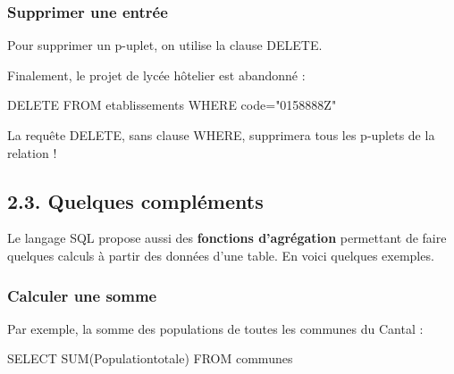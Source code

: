 \documentclass[
  a4paper,
  DIV=11,
  numbers=noendperiod]{scrartcl}
\newenvironment{Shaded}{\begin{snugshade}}{\end{snugshade}}
\newcommand{\FunctionTok}[1]{\textcolor[rgb]{0.28,0.35,0.67}{#1}}
\newcommand{\KeywordTok}[1]{\textcolor[rgb]{0.00,0.23,0.31}{#1}}
\newcommand{\NormalTok}[1]{\textcolor[rgb]{0.00,0.23,0.31}{#1}}
\newcommand{\OperatorTok}[1]{\textcolor[rgb]{0.37,0.37,0.37}{#1}}
\newcommand{\OtherTok}[1]{\textcolor[rgb]{0.00,0.23,0.31}{#1}}
\begin{document}
\hypertarget{supprimer-une-entruxe9e}{%
\subsubsection{Supprimer une entrée}\label{supprimer-une-entruxe9e}}

Pour supprimer un p-uplet, on utilise la clause DELETE.

Finalement, le projet de lycée hôtelier est abandonné :

\begin{Shaded}
\begin{Highlighting}[]
\KeywordTok{DELETE} \KeywordTok{FROM}\NormalTok{ etablissements}
\KeywordTok{WHERE}\NormalTok{ code}\OperatorTok{=}\OtherTok{"0158888Z"}
\end{Highlighting}
\end{Shaded}

\begin{tcolorbox}[enhanced jigsaw, toprule=.15mm, bottomtitle=1mm, toptitle=1mm, left=2mm, colback=white, leftrule=.75mm, arc=.35mm, coltitle=black, bottomrule=.15mm, breakable, colbacktitle=quarto-callout-warning-color!10!white, title=\textcolor{quarto-callout-warning-color}{\faExclamationTriangle}\hspace{0.5em}{Attention !}, titlerule=0mm, opacitybacktitle=0.6, rightrule=.15mm, opacityback=0]

La requête DELETE, sans clause WHERE, supprimera tous les p-uplets de la
relation !

\end{tcolorbox}

\hypertarget{quelques-compluxe9ments}{%
\subsection{2.3. Quelques compléments}\label{quelques-compluxe9ments}}

Le langage SQL propose aussi des \textbf{fonctions d'agrégation}
permettant de faire quelques calculs à partir des données d'une table.
En voici quelques exemples.

\hypertarget{calculer-une-somme}{%
\subsubsection{Calculer une somme}\label{calculer-une-somme}}

Par exemple, la somme des populations de toutes les communes du Cantal :

\begin{Shaded}
\begin{Highlighting}[]
\KeywordTok{SELECT} \FunctionTok{SUM}\NormalTok{(Populationtotale)}
\KeywordTok{FROM}\NormalTok{ communes}
\end{Highlighting}
\end{Shaded}
\end{document}
